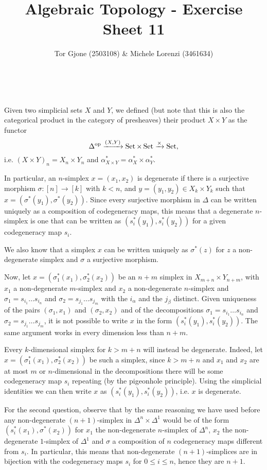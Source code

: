 \documentclass[a4paper,11pt,english]{article}
\title{\textbf{Algebraic Topology} - Exercise Sheet 11}
\author{Tor Gjone (2503108) \& Michele Lorenzi (3461634)}
\newcommand{\op}{{\operatorname{op}}}
\DeclareMathOperator{\Set}{Set}
\begin{document}
\mmaketitle

\begin{exercise}[1]\ 

Given two simplicial sets $X$ and $Y$, we defined (but note that this is also the categorical product in the category of presheaves) their product $X\times Y$ as the functor \[\Delta^\op\xto{(X,Y)}\Set\times\Set\xto{\times}\Set,\] i.e. $(X\times Y)_n=X_n\times Y_n$ and $\alpha^*_{X\times Y}=\alpha^*_X\times\alpha^*_Y$.

In particular, an $n$-simplex $x=(x_1,x_2)$ is degenerate if there is a surjective morphism $\sigma:[n]\to [k]$ with $k<n$, and $y=(y_1,y_2)\in X_k\times Y_k$ such that $x=(\sigma^*(y_1),\sigma^*(y_2))$. Since every surjective morphism in $\Delta$ can be written uniquely as a composition of codegeneracy maps, this means that a degenerate $n$-simplex is one that can be written as $(s^*_i(y_1),s^*_i(y_2))$ for a given codegeneracy map $s_i$. 

We also know that a simplex $x$ can be written uniquely as $\sigma^*(z)$ for $z$ a non-degenerate simplex and $\sigma$ a surjective morphism.

Now, let $x=(\sigma^*_1(x_1),\sigma^*_2(x_2))$ be an $n+m$ simplex in $X_{m+n}\times Y_{n+m}$, with $x_1$ a non-degenerate $m$-simplex and $x_2$ a non-degenerate $n$-simplex and $\sigma_1=s_{i_1}\dots s_{i_n}$ and $\sigma_2=s_{j_1}\dots s_{j_m}$ with the $i_\alpha$ and the $j_\beta$ distinct. Given uniqueness of the pairs $(\sigma_1,x_1)$ and $(\sigma_2,x_2)$ and of the decompositions $\sigma_1=s_{i_1}\dots s_{i_n}$ and $\sigma_2=s_{j_1}\dots s_{j_m}$, it is not possible to write $x$ in the form $(s^*_i(y_1),s^*_i(y_2))$. The same argument works in every dimension less than $n+m$.

Every $k$-dimensional simplex for $k>m+n$ will instead be degenerate. Indeed, let $x=(\sigma^*_1(x_1),\sigma^*_2(x_2))$ be such a simplex, since $k>m+n$ and $x_1$ and $x_2$ are at most $m$ or $n$-dimensional in the decompositions there will be some codegeneracy map $s_i$ repeating (by the pigeonhole principle). Using the simplicial identities we can then write $x$ as $(s^*_i(y_1),s^*_i(y_2))$, i.e. $x$ is degenerate.

For the second question, observe that by the same reasoning we have used before any non-degenerate $(n+1)$-simplex in $\Delta^n\times\Delta^1$ would be of the form $(s^*_i(x_1),\sigma^*(x_2))$ for $x_1$ the non-degenerate $n$-simplex of $\Delta^n$, $x_2$ the non-degenerate $1$-simplex of $\Delta^1$ and $\sigma$ a composition of $n$ codegeneracy maps different from $s_i$. In particular, this means that non-degenerate $(n+1)$-simplices are in bijection with the codegeneracy maps $s_i$ for $0\le i\le n$, hence they are $n+1$.

\end{exercise}
\end{document}
